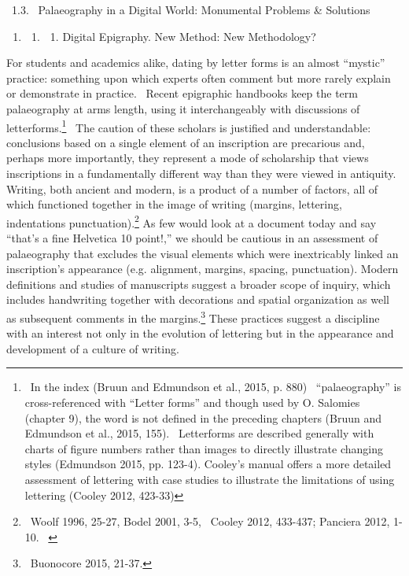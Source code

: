 \documentclass[amsthm,ebook]{saparticle}
\begin{document}
\bigskip

\ 1.3. \ Palaeography in a Digital World: Monumental Problems \& Solutions


\bigskip

\begin{enumerate}
\item \begin{enumerate}
\item \begin{enumerate}
\item Digital Epigraphy. New Method: New Methodology?
\end{enumerate}
\end{enumerate}
\end{enumerate}

\bigskip

For students and academics alike, dating by letter forms is an almost “mystic” practice: something upon which experts
often comment but more rarely explain or demonstrate in practice. \ Recent epigraphic handbooks keep the term
palaeography at arms length, using it interchangeably with discussions of letterforms.\footnote{ \ In the index (Bruun
and Edmundson et al., 2015, p. 880) \ “palaeography” is cross-referenced with “Letter forms” and though used by O.
Salomies (chapter 9), the word is not defined in the preceding chapters (Bruun and Edmundson et al., 2015, 155).
\ Letterforms are described generally with charts of figure numbers rather than images to directly illustrate changing
styles (Edmundson 2015, pp. 123-4). Cooley’s manual offers a more detailed assessment of lettering with case studies to
illustrate the limitations of using lettering (Cooley 2012, 423-33)} \ The caution of these scholars is justified and
understandable: conclusions based on a single element of an inscription are precarious and, perhaps more importantly,
they represent a mode of scholarship that views inscriptions in a fundamentally different way than they were viewed in
antiquity. Writing, both ancient and modern, is a product of a number of factors, all of which functioned together in
the image of writing (margins, lettering, indentations punctuation).\footnote{ \ Woolf 1996, 25-27, Bodel 2001, 3-5,
\ Cooley 2012, 433-437; Panciera 2012, 1-10. \ } As few would look at a document today and say “that’s a fine Helvetica
10 point!,” we should be cautious in an assessment of palaeography that excludes the visual elements which were
inextricably linked an inscription’s appearance (e.g. alignment, margins, spacing, punctuation). Modern definitions and
studies of manuscripts suggest a broader scope of inquiry, which includes handwriting together with decorations and
spatial organization as well as subsequent comments in the margins.\footnote{ \ Buonocore 2015, 21-37. } These
practices suggest a discipline with an interest not only in the evolution of lettering but in the appearance and
development of a culture of writing. 
\end{document}
